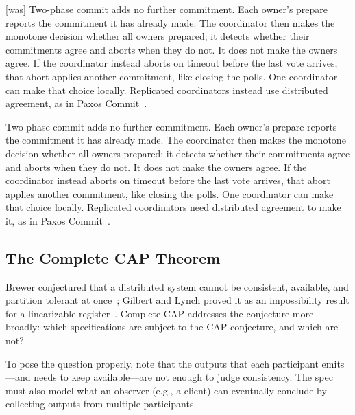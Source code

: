 \documentclass[sigconf]{cidr-2027}
\theoremstyle{remark}
\newcommand{\commitment}{commitment\xspace}
\newcommand{\commitments}{commitments\xspace}
\begin{document}
{\footnotesize\color{black!50}\noindent\textsf{[was]} Two-phase commit adds no further \commitment.  Each owner's prepare reports the
\commitment it has already made.  The coordinator then makes the monotone
decision whether all owners prepared; it detects whether their \commitments
agree and aborts when they do not.  It does not make the owners agree.  If the
coordinator instead aborts on timeout before the last vote arrives, that abort
applies another \commitment, like closing the polls.  One coordinator can make
that choice locally.  Replicated coordinators instead use distributed
agreement, as in Paxos Commit~\cite{gray2006consensus}.\par}

\color{blue!70!black}Two-phase commit adds no further \commitment.  Each owner's prepare reports the
\commitment it has already made.  The coordinator then makes the monotone
decision whether all owners prepared; it detects whether their \commitments
agree and aborts when they do not.  It does not make the owners agree.  If the
coordinator instead aborts on timeout before the last vote arrives, that abort
applies another \commitment, like closing the polls.  One coordinator can make
that choice locally.  Replicated coordinators need distributed agreement to
make it, as in Paxos Commit~\cite{gray2006consensus}.\color{black}

\subsection{The Complete CAP Theorem}
\label{sec:complete-cap}

Brewer conjectured that a distributed system cannot be consistent, available,
and partition tolerant at once~\cite{brewer2000towards}; Gilbert and Lynch
proved it as an impossibility result for a linearizable register~\cite{gilbert2002cap}.
Complete CAP addresses the conjecture more broadly:
which specifications are subject to the CAP
conjecture, and which are not?

To pose the question properly, note that the outputs that each participant emits---and
needs to keep available---are not enough to judge consistency. The spec
must also model what an observer (e.g., a client) can eventually conclude by collecting
outputs from multiple participants.
\end{document}
